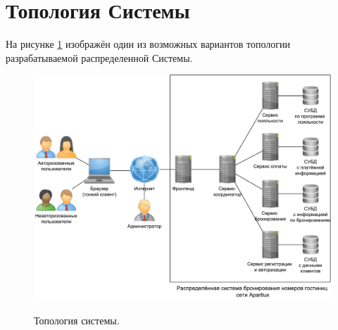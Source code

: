 \section*{Топология Системы}
На рисунке \ref{fig:topology} изображён один из возможных вариантов  топологии разрабатываемой распределенной Системы.
\begin{figure}[h]
	\begin{center}
		{\includegraphics[scale = 0.6]{img/pic/topology.pdf}}
		\caption{Топология системы.}
		\label{fig:topology}
	\end{center}
\end{figure}

